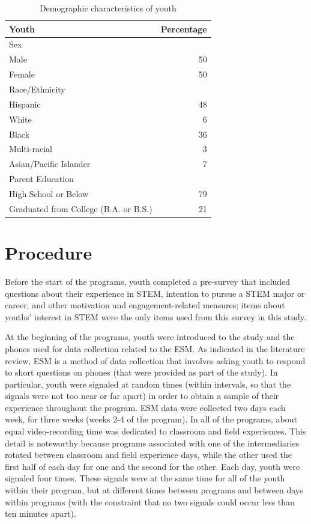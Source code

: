 \documentclass[]{msu-thesis}
\theoremstyle{definition}
\theoremstyle{definition}
\theoremstyle{definition}
\theoremstyle{remark}
\begin{document}
\begin{table}

\caption{\label{tab:unnamed-chunk-2}Demographic characteristics of youth}
\centering
\begin{tabular}[t]{lr}
\toprule
Youth & Percentage\\
\midrule
Sex & \\
Male & 50\\
Female & 50\\
Race/Ethnicity & \\
Hispanic & 48\\
\addlinespace
White & 6\\
Black & 36\\
Multi-racial & 3\\
Asian/Pacific Islander & 7\\
Parent Education & \\
\addlinespace
High School or Below & 79\\
Graduated from College (B.A. or B.S.) & 21\\
\bottomrule
\end{tabular}
\end{table}

\section{Procedure}\label{procedure}

Before the start of the programs, youth completed a pre-survey that
included questions about their experience in STEM, intention to pursue a
STEM major or career, and other motivation and engagement-related
measures; items about youths' interest in STEM were the only items used
from this survey in this study.

At the beginning of the programs, youth were introduced to the study and
the phones used for data collection related to the ESM. As indicated in
the literature review, ESM is a method of data collection that involves
asking youth to respond to short questions on phones (that were provided
as part of the study). In particular, youth were signaled at random
times (within intervals, so that the signals were not too near or far
apart) in order to obtain a sample of their experience throughout the
program. ESM data were collected two days each week, for three weeks
(weeks 2-4 of the program). In all of the programs, about equal
video-recording time was dedicated to classroom and field experiences.
This detail is noteworthy because programs associated with one of the
intermediaries rotated between classroom and field experience days,
while the other used the first half of each day for one and the second
for the other. Each day, youth were signaled four times. These signals
were at the same time for all of the youth within their program, but at
different times between programs and between days within programs (with
the constraint that no two signals could occur less than ten minutes
apart).
\end{document}
